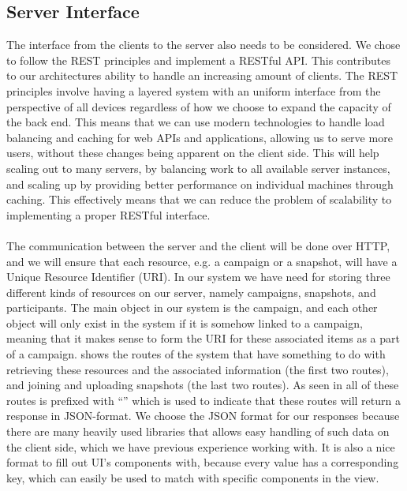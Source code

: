 \subsection{Server Interface}
\label{sub:server_interface}
The interface from the clients to the server also needs to be considered. We chose to follow the REST principles \parencite{http_manden} and implement a RESTful API. This contributes to our architectures ability to handle an increasing amount of clients. The REST principles involve having a layered system with an uniform interface from the perspective of all devices regardless of how we choose to expand the capacity of the back end. This means that we can use modern technologies to handle load balancing and caching for web APIs and applications, allowing us to serve more users, without these changes being apparent on the client side. This will help scaling out to many servers, by balancing work to all available server instances, and scaling up by providing better performance on individual machines through caching. This effectively means that we can reduce the problem of scalability to implementing a proper RESTful interface. 
\\\\
The communication between the server and the client will be done over HTTP, and we will ensure that each resource, e.g. a campaign or a snapshot, will have a Unique Resource Identifier (URI). In our system we have need for storing three different kinds of resources on our server, namely campaigns, snapshots, and participants. The main object in our system is the campaign, and each other object will only exist in the system if it is somehow linked to a campaign, meaning that it makes sense to form the URI for these associated items as a part of a campaign.  shows the routes of the system that have something to do with retrieving these resources and the associated information (the first two routes), and joining and uploading snapshots (the last two routes). As seen in  all of these routes is prefixed with ``'' which is used to indicate that these routes will return a response in JSON-format. We choose the JSON format for our responses because there are many heavily used libraries that allows easy handling of such data on the client side, which we have previous experience working with. It is also a nice format to fill out UI's components with, because every value has a corresponding key, which can easily be used to match with specific components in the view. 

